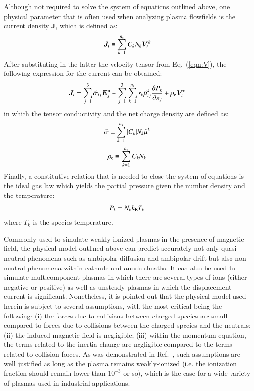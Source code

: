 \documentclass[twoside,onecolumn,10pt]{waflarticle}
\renewcommand{\vec}[1]{\bm{#1}}
\newcommand{\mfd}{\displaystyle}
\newcommand{\ns}{{n_{\rm s}}}
\renewcommand{\vec}[1]{\bm{ #1 }}
\begin{document}
Although not required to solve the system of equations outlined above, one physical parameter that is often used when analyzing plasma flowfields is the current density $\vec{J}$, which is defined as:
%
\begin{equation}
  \vec{J}_i \equiv \sum_{k=1}^\ns C_k N_k  \vec{V}^k_i
 \label{eqn:Jdefinition}
\end{equation}
%
After substituting in the latter the velocity tensor from Eq.\ (\ref{eqn:V}), the following expression for the current can be obtained:
%
\begin{equation}
\begin{array}{l}
\mfd  \vec{J}_i = \sum_{j=1}^3  \wtilde{\sigma}_{ij} \vec{E}_j^{\rm n} 
             - \sum_{j=1}^3 \sum_{k=1}^\ns s_k \wtilde{\mu}^k_{ij}  \frac{\partial P_k}{\partial x_j}
+ \rho_{\rm e} \vec{V}_i^{\rm n} 
\end{array}
\label{eqn:J}
\end{equation}
%
in which the tensor conductivity and the net charge density are defined as:
%
\begin{equation}
\begin{array}{l}
\mfd
\wtilde{\sigma}\equiv\sum_{k=1}^\ns |C_k| N_k \wtilde{\mu}^k
\end{array}
\label{eqn:sigmatilde}
\end{equation}
%
%
\begin{equation}
\rho_{\rm e}\equiv\sum_{k=1}^\ns C_k N_k
\label{eqn:rhoe}
\end{equation}
%
Finally, a constitutive relation that is needed to close the system of equations is the ideal gas law which yields the partial pressure given the number density and the temperature:
%
\begin{equation}
P_k = N_k k_{\rm B} T_k
\label{eqn:Pk}
\end{equation}
%
where $T_k$ is the species temperature.

Commonly used to simulate weakly-ionized plasmas in the presence of magnetic field, the physical model outlined above can predict accurately not only quasi-neutral phenomena such as ambipolar diffusion and ambipolar drift but also non-neutral phenomena within cathode and anode sheaths. It can also be used to simulate multicomponent plasmas in which there are several types of ions (either negative or positive) as well as unsteady plasmas in which the displacement current is significant. Nonetheless, it is pointed out that the physical model used herein is subject to several assumptions, with the most critical being the following: (i) the forces due to collisions between charged species are small compared to forces due to collisions  between the charged species and the neutrals; (ii) the induced magnetic field is negligible; (iii) within the momentum equation, the terms related to the inertia change are negligible compared to the terms related to collision forces. As was demonstrated in Ref.\ \cite{jcp:2011:parent}, such assumptions are well justified as long as the plasma remains weakly-ionized (i.e. the ionization fraction should remain lower than $10^{-3}$ or so), which is the case for a wide variety of plasmas used in industrial applications.     
\end{document}

